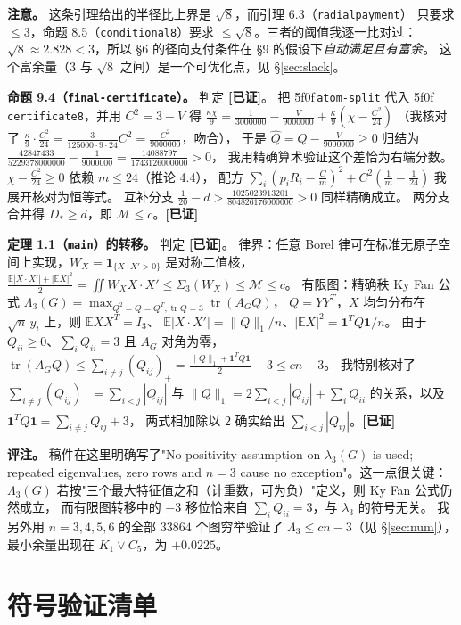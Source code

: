 \documentclass[UTF8,11pt]{ctexart}
\theoremstyle{definition}
\newcommand{\tr}{\operatorname{tr}}
\newcommand{\E}{\mathbb{E}}
\newcommand{\peq}[1]{\textup{\u5f0f}\,\texttt{#1}}
\newcommand{\ok}{\textcolor[rgb]{0.05,0.45,0.15}{\bfseries [已证]}}
\begin{document}
\textbf{注意。} 这条引理给出的半径比上界是 $\sqrt8$，而引理 6.3（\texttt{radialpayment}）
只要求 $\le3$，命题 8.5（\texttt{conditional8}）要求 $\le\sqrt8$。三者的阈值我逐一比对过：
$\sqrt8\approx2.828<3$，所以 \S6 的径向支付条件在 \S9 的假设下\emph{自动满足且有富余}。
这个富余量（$3$ 与 $\sqrt8$ 之间）是一个可优化点，见 \S\ref{sec:slack}。

\textbf{命题 9.4（\texttt{final-certificate}）。} 判定 \ok。
把 \peq{atom-split} 代入 \peq{certificate8}，并用 $C^2=3-V$ 得
$\frac{\kappa\chi}9=\frac1{3000000}-\frac V{9000000}+\frac\kappa9(\chi-\frac{C^2}{24})$
（我核对了 $\frac\kappa9\cdot\frac{C^2}{24}=\frac{3}{125000\cdot9\cdot24}C^2=\frac{C^2}{9000000}$，吻合），
于是 $\widehat Q=Q-\frac V{9000000}\ge0$ 归结为
$\frac{42847433}{5229378000000}-\frac1{9000000}=\frac{14088797}{1743126000000}>0$，
我用精确算术验证这个差恰为右端分数。$\chi-\frac{C^2}{24}\ge0$ 依赖 $m\le24$（推论 4.4），
配方 $\sum_i(p_iR_i-\frac Cm)^2+C^2(\frac1m-\frac1{24})$ 我展开核对为恒等式。
互补分支 $\frac1{20}-d>\frac{1025023913201}{804826176000000}>0$ 同样精确成立。
两分支合并得 $D_*\ge d$，即 $\mathcal M\le c$。\hfill\ok

\textbf{定理 1.1（\texttt{main}）的转移。} 判定 \ok。
律界：任意 Borel 律可在标准无原子空间上实现，$W_X=\mathbf1_{\{X\cdot X'>0\}}$ 是对称二值核，
$\frac{\E|X\cdot X'|+|\E X|^2}2=\iint W_XX\cdot X'\le\Sigma_3(W_X)\le\mathcal M\le c$。
有限图：精确秩 Ky Fan 公式 $\Lambda_3(G)=\max_{Q^2=Q=Q^T,\tr Q=3}\tr(A_GQ)$，
$Q=YY^T$，$X$ 均匀分布在 $\sqrt n\,y_i$ 上，则 $\E XX^T=I_3$、
$\E|X\cdot X'|=\|Q\|_1/n$、$|\E X|^2=\mathbf1^TQ\mathbf1/n$。
由于 $Q_{ii}\ge0$、$\sum_iQ_{ii}=3$ 且 $A_G$ 对角为零，
$\tr(A_GQ)\le\sum_{i\ne j}(Q_{ij})_+=\frac{\|Q\|_1+\mathbf1^TQ\mathbf1}2-3\le cn-3$。
我特别核对了 $\sum_{i\ne j}(Q_{ij})_+=\sum_{i<j}|Q_{ij}|$ 与
$\|Q\|_1=2\sum_{i<j}|Q_{ij}|+\sum_iQ_{ii}$ 的关系，以及 $\mathbf1^TQ\mathbf1=\sum_{i\ne j}Q_{ij}+3$，
两式相加除以 $2$ 确实给出 $\sum_{i<j}|Q_{ij}|$。\hfill\ok

\textbf{评注。} 稿件在这里明确写了"No positivity assumption on $\lambda_3(G)$ is used;
repeated eigenvalues, zero rows and $n=3$ cause no exception"。这一点很关键：
$\Lambda_3(G)$ 若按"三个最大特征值之和（计重数，可为负）"定义，则 Ky Fan 公式仍然成立，
而有限图转移中的 $-3$ 移位恰来自 $\sum_iQ_{ii}=3$，与 $\lambda_3$ 的符号无关。
我另外用 $n=3,4,5,6$ 的全部 $33864$ 个图穷举验证了 $\Lambda_3\le cn-3$（见 \S\ref{sec:num}），
最小余量出现在 $K_1\vee C_5$，为 $+0.0225$。

\section{符号验证清单}\label{sec:sym}
\end{document}
